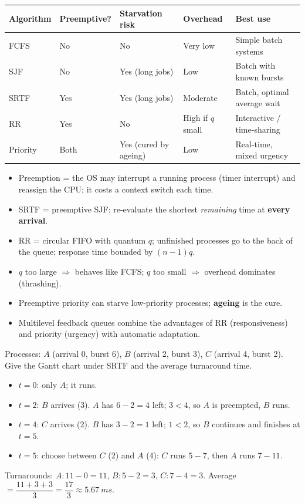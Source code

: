 \documentclass[11pt]{article}
\begin{document}
\begin{center}
\begin{tabularx}{\linewidth}{|l|X|X|X|X|}
\hline
\rowcolor{popblueL} Algorithm & Preemptive? & Starvation risk & Overhead & Best use \\
\hline
FCFS & No & No & Very low & Simple batch systems \\
\hline
SJF & No & Yes (long jobs) & Low & Batch with known bursts \\
\hline
SRTF & Yes & Yes (long jobs) & Moderate & Batch, optimal average wait \\
\hline
RR & Yes & No & High if $q$ small & Interactive / time-sharing \\
\hline
Priority & Both & Yes (cured by ageing) & Low & Real-time, mixed urgency \\
\hline
\end{tabularx}
\end{center}

\begin{aretenir}
\begin{itemize}
\item Preemption = the OS may interrupt a running process (timer interrupt) and reassign the CPU; it costs a context switch each time.
\item SRTF = preemptive SJF: re-evaluate the shortest \emph{remaining} time at \textbf{every arrival}.
\item RR = circular FIFO with quantum $q$; unfinished processes go to the back of the queue; response time bounded by $(n-1)q$.
\item $q$ too large $\Rightarrow$ behaves like FCFS; $q$ too small $\Rightarrow$ overhead dominates (thrashing).
\item Preemptive priority can starve low-priority processes; \textbf{ageing} is the cure.
\item Multilevel feedback queues combine the advantages of RR (responsiveness) and priority (urgency) with automatic adaptation.
\end{itemize}
\end{aretenir}

\begin{exoresolu}
Processes: $A$ (arrival 0, burst 6), $B$ (arrival 2, burst 3), $C$ (arrival 4, burst 2). Give the Gantt chart under SRTF and the average turnaround time.
\tcblower
\begin{itemize}
\item $t=0$: only $A$; it runs.
\item $t=2$: $B$ arrives (3). $A$ has $6-2=4$ left; $3 < 4$, so $A$ is preempted, $B$ runs.
\item $t=4$: $C$ arrives (2). $B$ has $3-2=1$ left; $1 < 2$, so $B$ continues and finishes at $t=5$.
\item $t=5$: choose between $C$ (2) and $A$ (4): $C$ runs $5\!-\!7$, then $A$ runs $7\!-\!11$.
\end{itemize}
Turnarounds: $A: 11-0=11$, $B: 5-2=3$, $C: 7-4=3$. Average $= \dfrac{11+3+3}{3} = \dfrac{17}{3} \approx \SI{5.67}{ms}$.
\end{exoresolu}
\end{document}
